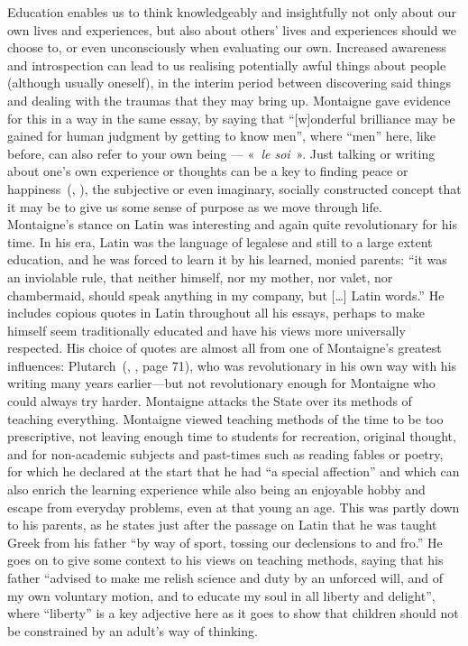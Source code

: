 \documentclass[12pt,a4paper]{article}
\begin{document}
Education enables us to think knowledgeably and insightfully not only
about our own lives and experiences, but also about others' lives and
experiences should we choose to, or even unconsciously when evaluating
our own. Increased awareness and introspection can lead to us
realising potentially awful things about people (although usually
oneself), in the interim period between discovering said things and
dealing with the traumas that they may bring up. Montaigne gave
evidence for this in a way in the same essay, by saying that
``[w]onderful brilliance may be gained for human judgment by getting
to know men'', where ``men'' here, like before, can also refer to your
own being --- «~\textsl{le soi}~». Just talking or writing about one's
own experience or thoughts can be a key to finding peace or
happiness~(\citeauthor{baikie2005emotional},
\citeyear{baikie2005emotional}), the subjective or even imaginary,
socially constructed concept that it may be to give us some sense of
purpose as we move through life.\\

Montaigne's stance on Latin was interesting and again quite
revolutionary for his time. In his era, Latin was the language of
legalese and still to a large extent education, and he was forced to
learn it by his learned, monied parents: ``it was an inviolable rule,
that neither himself, nor my mother, nor valet, nor chambermaid,
should speak anything in my company, but [\ldots] Latin words.'' He
includes copious quotes in Latin throughout all his essays, perhaps to
make himself seem traditionally educated and have his views more
universally respected. His choice of quotes are almost all from one of
Montaigne's greatest influences:
Plutarch~(\citeauthor{friedrich1991montaigne},
\citeyear{friedrich1991montaigne}, page 71), who was revolutionary in
his own way with his writing many years earlier---but not
revolutionary enough for Montaigne who could always try harder.
Montaigne attacks the State over its methods of teaching everything.
Montaigne viewed teaching methods of the time to be too prescriptive,
not leaving enough time to students for recreation, original thought,
and for non-academic subjects and past-times such as reading fables or
poetry, for which he declared at the start that he had ``a special
affection'' and which can also enrich the learning experience while
also being an enjoyable hobby and escape from everyday problems, even
at that young an age. This was partly down to his parents, as he
states just after the passage on Latin that he was taught Greek from
his father ``by way of sport, tossing our declensions to and fro.'' He
goes on to give some context to his views on teaching methods, saying
that his father ``advised to make me relish science and duty by an
unforced will, and of my own voluntary motion, and to educate my soul
in all liberty and delight'', where ``liberty'' is a key adjective
here as it goes to show that children should not be constrained by an
adult's way of thinking.\\
\end{document}
